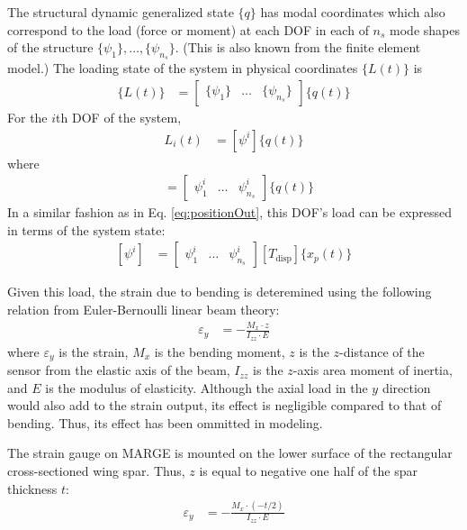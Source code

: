 The structural dynamic generalized state $\{q\}$ has modal coordinates which also correspond to the load (force or moment) at each DOF in each of $n_s$ mode shapes of the structure $\{\psi_1\}, \dots, \{\psi_{n_s}\}$. (This is also known from the finite element model.) The loading state of the system in physical coordinates $\{L(t)\}$ is
\begin{align}
	\{L(t)\} &= \begin{bmatrix} \{\psi_1\} & \dots & \{\psi_{n_s}\} \end{bmatrix} \{q(t)\}
\end{align}
For the $i$th DOF of the system,
\begin{align}
	L_i(t) &= [\psi^i] \{q(t)\}
\end{align}
where
\begin{align}
	[\psi^i] &= \begin{bmatrix} \psi_1^i & \dots & \psi_{n_s}^i \end{bmatrix} \{q(t)\}
\end{align}
In a similar fashion as in Eq. \ref{eq:positionOut}, this DOF's load can be expressed in terms of the system state:
\begin{align}
	\label{eq:loadOut}
	[\psi^i] &= \begin{bmatrix} \psi_1^i & \dots & \psi_{n_s}^i \end{bmatrix} [T_\text{disp}] \{x_p(t)\}
\end{align}

Given this load, the strain due to bending is deteremined using the following relation from Euler-Bernoulli linear beam theory:
\begin{align}
	\label{eq:beamTheory}
	\varepsilon_{y} &= -\frac{M_x \cdot z}{I_{zz} \cdot E}
\end{align}
where $\varepsilon_y$ is the strain, $M_x$ is the bending moment, $z$ is the $z$-distance of the sensor from the elastic axis of the beam, $I_{zz}$ is the $z$-axis area moment of inertia, and $E$ is the modulus of elasticity. Although the axial load in the $y$ direction would also add to the strain output, its effect is negligible compared to that of bending. Thus, its effect has been ommitted in modeling.

The strain gauge on MARGE is mounted on the lower surface of the rectangular cross-sectioned wing spar.  Thus, $z$ is equal to negative one half of the spar thickness $t$:
\begin{align}
	\varepsilon_{y} &= -\frac{M_x \cdot (-t/2)}{I_{zz} \cdot E}
\end{align}


